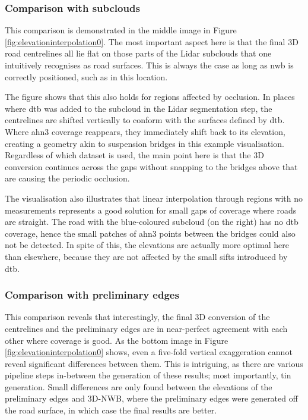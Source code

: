 \subsubsection{Comparison with subclouds}

This comparison is demonstrated in the middle image in Figure \ref{fig:elevationinterpolation0}. The most important aspect here is that the final 3D road centrelines all lie flat on those parts of the Lidar subclouds that one intuitively recognises as road surfaces. This is always the case as long as \ac{nwb} is correctly positioned, such as in this location.

The figure shows that this also holds for regions affected by occlusion. In places where \ac{dtb} was added to the subcloud in the Lidar segmentation step, the centrelines are shifted vertically to conform with the surfaces defined by \ac{dtb}. Where \ac{ahn3} coverage reappears, they immediately shift back to its elevation, creating a geometry akin to suspension bridges in this example visualisation. Regardless of which dataset is used, the main point here is that the 3D conversion continues across the gaps without snapping to the bridges above that are causing the periodic occlusion.

The visualisation also illustrates that linear interpolation through regions with no measurements represents a good solution for small gaps of coverage where roads are straight. The road with the blue-coloured subcloud (on the right) has no \ac{dtb} coverage, hence the small patches of \ac{ahn3} points between the bridges could also not be detected. In spite of this, the elevations are actually more optimal here than elsewhere, because they are not affected by the small sifts introduced by \ac{dtb}.

\subsubsection{Comparison with preliminary edges}

This comparison reveals that interestingly, the final 3D conversion of the centrelines and the preliminary edges are in near-perfect agreement with each other where coverage is good. As the bottom image in Figure \ref{fig:elevationinterpolation0} shows, even a five-fold vertical exaggeration cannot reveal significant differences between them. This is intriguing, as there are various pipeline steps in-between the generation of these results; most importantly, \ac{tin} generation. Small differences are only found between the elevations of the preliminary edges and 3D-NWB, where the preliminary edges were generated off the road surface, in which case the final results are better.

